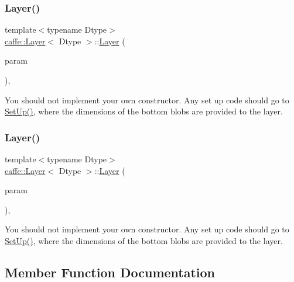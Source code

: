 \subsubsection{\texorpdfstring{Layer()}{Layer()}\hspace{0.1cm}{\footnotesize\ttfamily [1/2]}}
{\footnotesize\ttfamily template$<$typename Dtype$>$ \\
\mbox{\hyperlink{classcaffe_1_1_layer}{caffe\+::\+Layer}}$<$ Dtype $>$\+::\mbox{\hyperlink{classcaffe_1_1_layer}{Layer}} (\begin{DoxyParamCaption}\item[{const \mbox{\hyperlink{classcaffe_1_1_layer_parameter}{Layer\+Parameter}} \&}]{param }\end{DoxyParamCaption})\hspace{0.3cm}{\ttfamily [inline]}, {\ttfamily [explicit]}}

You should not implement your own constructor. Any set up code should go to \mbox{\hyperlink{classcaffe_1_1_layer_a18d6bfdb535ab8e96a971dec4ae39a84}{Set\+Up()}}, where the dimensions of the bottom blobs are provided to the layer. \mbox{\label{classcaffe_1_1_layer_a7b4e4ccea08c7b8b15acc6829d5735f6}} 
\subsubsection{\texorpdfstring{Layer()}{Layer()}\hspace{0.1cm}{\footnotesize\ttfamily [2/2]}}
{\footnotesize\ttfamily template$<$typename Dtype$>$ \\
\mbox{\hyperlink{classcaffe_1_1_layer}{caffe\+::\+Layer}}$<$ Dtype $>$\+::\mbox{\hyperlink{classcaffe_1_1_layer}{Layer}} (\begin{DoxyParamCaption}\item[{const \mbox{\hyperlink{classcaffe_1_1_layer_parameter}{Layer\+Parameter}} \&}]{param }\end{DoxyParamCaption})\hspace{0.3cm}{\ttfamily [inline]}, {\ttfamily [explicit]}}

You should not implement your own constructor. Any set up code should go to \mbox{\hyperlink{classcaffe_1_1_layer_a18d6bfdb535ab8e96a971dec4ae39a84}{Set\+Up()}}, where the dimensions of the bottom blobs are provided to the layer. 

\subsection{Member Function Documentation}
\mbox{\label{classcaffe_1_1_layer_a1c0b2bffcd6d57e4bd49f820941badb6}} 
